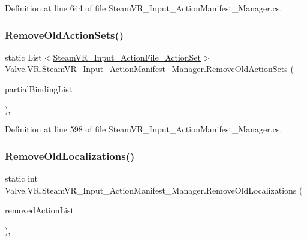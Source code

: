 Definition at line 644 of file Steam\+V\+R\+\_\+\+Input\+\_\+\+Action\+Manifest\+\_\+\+Manager.\+cs.

\mbox{\label{class_valve_1_1_v_r_1_1_steam_v_r___input___action_manifest___manager_ae88b3db8a5905d69acc87f259565e5ef}} 
\subsubsection{\texorpdfstring{RemoveOldActionSets()}{RemoveOldActionSets()}}
{\footnotesize\ttfamily static List$<$\mbox{\hyperlink{class_valve_1_1_v_r_1_1_steam_v_r___input___action_file___action_set}{Steam\+V\+R\+\_\+\+Input\+\_\+\+Action\+File\+\_\+\+Action\+Set}}$>$ Valve.\+V\+R.\+Steam\+V\+R\+\_\+\+Input\+\_\+\+Action\+Manifest\+\_\+\+Manager.\+Remove\+Old\+Action\+Sets (\begin{DoxyParamCaption}\item[{List$<$ \mbox{\hyperlink{class_valve_1_1_v_r_1_1_steam_v_r___partial_input_bindings}{Steam\+V\+R\+\_\+\+Partial\+Input\+Bindings}} $>$}]{partial\+Binding\+List }\end{DoxyParamCaption})\hspace{0.3cm}{\ttfamily [static]}, {\ttfamily [protected]}}



Definition at line 598 of file Steam\+V\+R\+\_\+\+Input\+\_\+\+Action\+Manifest\+\_\+\+Manager.\+cs.

\mbox{\label{class_valve_1_1_v_r_1_1_steam_v_r___input___action_manifest___manager_a7cf57180bbaf2b60179d87c2d0bc8dfb}} 
\subsubsection{\texorpdfstring{RemoveOldLocalizations()}{RemoveOldLocalizations()}}
{\footnotesize\ttfamily static int Valve.\+V\+R.\+Steam\+V\+R\+\_\+\+Input\+\_\+\+Action\+Manifest\+\_\+\+Manager.\+Remove\+Old\+Localizations (\begin{DoxyParamCaption}\item[{List$<$ \mbox{\hyperlink{class_valve_1_1_v_r_1_1_steam_v_r___input___action_file___action}{Steam\+V\+R\+\_\+\+Input\+\_\+\+Action\+File\+\_\+\+Action}} $>$}]{removed\+Action\+List }\end{DoxyParamCaption})\hspace{0.3cm}{\ttfamily [static]}, {\ttfamily [protected]}}



